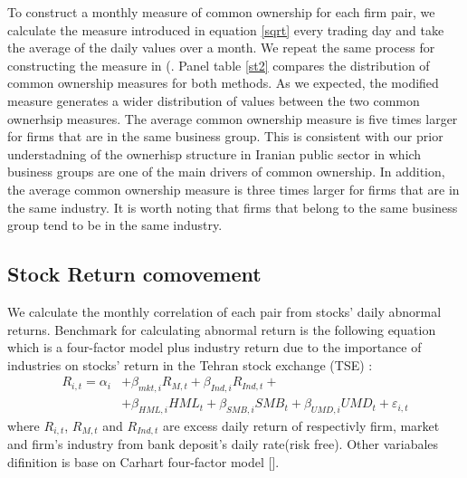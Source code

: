 To construct a monthly measure of common ownership for each firm pair, we calculate the measure introduced in equation \ref{sqrt} every trading day and take the average of the daily values over a month. We repeat the same process for constructing the measure in  (\cite{AntonPolk}. Panel  table \ref{st2} compares the distribution of common ownership measures for both methods. As we expected, the modified measure generates a wider distribution of values between the two common ownerhsip measures. The average common ownership measure is five times larger for firms that are in the same business group. This is consistent with our prior understadning of the ownerhisp structure in Iranian public sector in which business groups are one of the main drivers of common ownership. In addition, the average common ownership measure is three times larger for firms that are in the same industry. It is worth noting that firms that belong to the same business group tend to be in the same industry.
%		
		
\FloatBarrier
\subsection{{Stock Return comovement}}
\label{comovement}

	We calculate the monthly correlation of each pair from stocks' daily abnormal returns. Benchmark for calculating abnormal return is the following equation which is a four-factor model plus industry return due to the importance of industries on stocks' return in the Tehran stock exchange (TSE) :
	\begin{equation}
		\begin{split}
			R_{i,t} =\alpha _{i}&+\beta _{mkt,i}{\mathit {R}}_{M,t} + \beta_{Ind,i}{\mathit {R}}_{Ind,t} + \\
			&+\beta _{HML,i}{\mathit {HML}}_{t}+\beta _{SMB,i}{\mathit {SMB}}_{t}+\beta _{UMD,i}{\mathit {UMD}}_{t}+ \varepsilon_{i,t}
		\end{split}
		\label{e5Factor}
	\end{equation}
	where $ R_{i,t} $, $ R_{M,t} $ and $ R_{Ind,t} $ are excess daily return of respectivly  firm, market and firm's industry from bank deposit's daily rate(risk free). Other variabales difinition is base on Carhart four-factor model [\cite{Carhart4Factor}].
	
